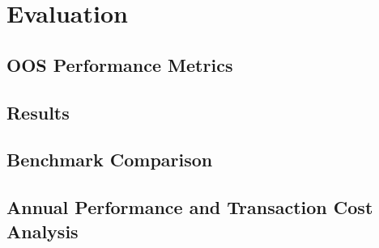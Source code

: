 \section{Evaluation}

\subsection{OOS Performance Metrics}

\subsection{Results}

\subsection{Benchmark Comparison}

\subsection{Annual Performance and Transaction Cost Analysis}